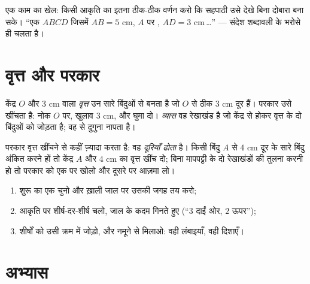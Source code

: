 \begin{example}[बहुभुज का वर्णन]\label{ex:g4:geometry:describe}
एक काम का खेल: किसी आकृति का इतना ठीक-ठीक वर्णन करो कि सहपाठी
उसे देखे बिना दोबारा बना सके। ``एक  $ABCD$ जिसमें
$AB = 5$ cm, $A$ पर , $AD = 3$ cm\,\dots'' ---
संदेश शब्दावली के भरोसे ही चलता है।
\end{example}

\section{वृत्त और परकार}

\begin{definition}[वृत्त]\label{def:g4:geometry:circle}
केंद्र $O$ और  $3$ cm वाला \emph{वृत्त} उन सारे बिंदुओं
से बनता है जो $O$ से ठीक $3$ cm दूर हैं। परकार उसे खींचता है:
नोक $O$ पर, खुलाव $3$ cm, और घुमा दो। \emph{व्यास} वह रेखाखंड है
जो केंद्र से होकर वृत्त के दो बिंदुओं को जोड़ता है; वह 
से दुगुना नापता है।
\end{definition}

\begin{example}[परकार, दूरी सँभालने वाला औज़ार]\label{ex:g4:geometry:compass}
परकार वृत्त खींचने से कहीं ज़्यादा करता है: वह \emph{दूरियाँ
ढोता} है। किसी बिंदु $A$ से $4$ cm दूर के सारे बिंदु अंकित करने
हों तो केंद्र $A$ और  $4$ cm का वृत्त खींच दो; बिना
मापपट्टी के दो रेखाखंडों की तुलना करनी हो तो परकार को एक पर खोलो और दूसरे पर आज़मा लो।
\end{example}

\begin{method}[जाल पर आकृति दोबारा बनाना]\label{met:g4:geometry:reproduce}
\begin{enumerate}
  \item शुरू का एक  चुनो और ख़ाली जाल पर उसकी जगह तय करो;
  \item आकृति पर शीर्ष-दर-शीर्ष चलो, जाल के कदम गिनते हुए
        (``$3$ दाईं ओर, $2$ ऊपर'');
  \item शीर्षों को उसी क्रम में जोड़ो, और नमूने से मिलाओ:
        वही लंबाइयाँ, वही दिशाएँ।
\end{enumerate}
\end{method}

\section{अभ्यास}

